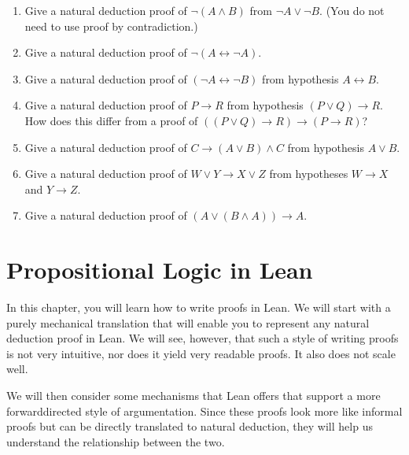 \documentclass[letterpaper,10pt,english]{sphinxmanual}
\begin{document}
\begin{enumerate}
\item {} 
\sphinxAtStartPar
Give a natural deduction proof of \(\neg (A \wedge B)\) from \(\neg A \vee \neg B\). (You do not need to use proof by contradiction.)

\item {} 
\sphinxAtStartPar
Give a natural deduction proof of \(\neg (A \leftrightarrow \neg A)\).

\item {} 
\sphinxAtStartPar
Give a natural deduction proof of \((\neg A \leftrightarrow \neg B)\) from hypothesis \(A \leftrightarrow B\).

\item {} 
\sphinxAtStartPar
Give a natural deduction proof of \(P \to R\) from hypothesis \((P \vee Q) \to R\). How does this differ from a proof of \(((P \vee Q) \to R) \to (P \to R)\)?

\item {} 
\sphinxAtStartPar
Give a natural deduction proof of \(C \to (A \vee B) \wedge C\) from hypothesis \(A \vee B\).

\item {} 
\sphinxAtStartPar
Give a natural deduction proof of \(W \vee Y \to X \vee Z\) from hypotheses \(W \to X\) and \(Y \to Z\).

\item {} 
\sphinxAtStartPar
Give a natural deduction proof of \((A \vee (B \wedge A)) \to A\).

\end{enumerate}


\chapter{Propositional Logic in Lean}
\label{\detokenize{propositional_logic_in_lean:propositional-logic-in-lean}}\label{\detokenize{propositional_logic_in_lean::doc}}
\sphinxAtStartPar
In this chapter, you will learn how to write proofs in Lean. We will start with a purely mechanical translation that will enable you to represent any natural deduction proof in Lean. We will see, however, that such a style of writing proofs is not very intuitive, nor does it yield very readable proofs. It also does not scale well.

\sphinxAtStartPar
We will then consider some mechanisms that Lean offers that support a more forward\sphinxhyphen{}directed style of argumentation. Since these proofs look more like informal proofs but can be directly translated to natural deduction, they will help us understand the relationship between the two.
\end{document}
